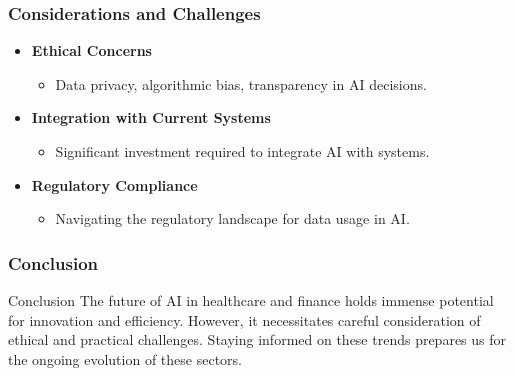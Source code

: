 \documentclass[aspectratio=169]{beamer}
\begin{document}
\begin{frame}[fragile]
    \frametitle{Considerations and Challenges}
    \begin{itemize}
        \item \textbf{Ethical Concerns}
            \begin{itemize}
                \item Data privacy, algorithmic bias, transparency in AI decisions.
            \end{itemize}
        \item \textbf{Integration with Current Systems}
            \begin{itemize}
                \item Significant investment required to integrate AI with systems.
            \end{itemize}
        \item \textbf{Regulatory Compliance}
            \begin{itemize}
                \item Navigating the regulatory landscape for data usage in AI.
            \end{itemize}
    \end{itemize}
\end{frame}

\begin{frame}[fragile]
    \frametitle{Conclusion}
    \begin{block}{Conclusion}
        The future of AI in healthcare and finance holds immense potential for innovation and efficiency. However, it necessitates careful consideration of ethical and practical challenges. Staying informed on these trends prepares us for the ongoing evolution of these sectors.
    \end{block}
\end{frame}
\end{document}
